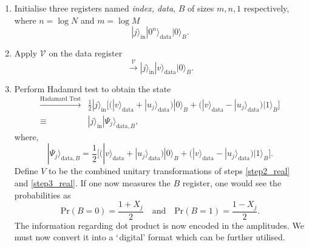 \documentclass[a4paper,twocolumn,11pt,unpublished]{quantumarticle}
\newcommand{\rang}{\rangle}
\begin{document}
        \begin{enumerate}
            \item 
                \label{step1_real}
                Initialise three registers named \textit{index, data}, $B$ of sizes $m, n, 1$ respectively, where $n= \log N$ and $m = \log M$
                \begin{equation}
                    |j\rang_{\text{in}}|0^{ n}\rang_{\text{data}}|0\rang_B.
                \end{equation}
            \item
                \label{step2_real}
                Apply $\mathcal V$ on the data register
                \begin{equation}
                    \xrightarrow{\mathcal{V}}|j\rang_{\text{in}}|v\rang_{\text{data}}|0\rang_B.
                \end{equation}
            \item
                \label{step3_real}
                Perform Hadamrd test to obtain the state
                \begin{equation}
                \begin{split}
                    \xrightarrow{\text{Hadamard Test}}&\frac{1}{2} |j\rang_{\text{in}}\Big[\Big( |v\rang_{\text{data}} + |u_j\rang_{\text{data}}\Big) |0\rang_B + 
                    \Big( |v\rang_{\text{data}} - |u_j\rang_{\text{data}} \Big) |1\rang_B \Big]\\ 
                    \equiv &|j\rang_\text{in}|\Psi_j\rang_{\text{data}, B},
                \end{split}
                \end{equation}
                where, 
                \begin{equation}
                    |\Psi_j\rang_{\text{data}, B} = \frac{1}{2} \Big[ \Big( |v\rang_{\text{data}} + |u_j\rang_{\text{data}}\Big) |0\rang_B + 
                    \Big( |v\rang_{\text{data}} - |u_j\rang_{\text{data}} \Big) |1\rang_B \Big].    
                \end{equation}
                Define $V$ to be the combined unitary transformations of steps \ref{step2_real} and \ref{step3_real}. If one now measures the $B$ register, one would see the probabilities as    
                \begin{equation}
                    \text{Pr}(B = 0) = \frac{1+X_j}{2} \quad \text{and} \quad \text{Pr}( B = 1) = \frac{1-X_j}{2}.
                \end{equation}
                The information regarding dot product is now encoded in the amplitudes. We must now convert it into a $\lq$digital' format which can be further utilised.


\end{enumerate}
\end{document}
